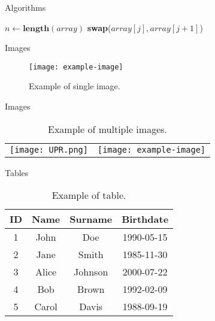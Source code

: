 \documentclass[12pt]{beamer}
\begin{document}
\begin{frame}[allowframebreaks]{Algorithms}
	\begin{algorithmic}
		\State $n \gets \textbf{length}(array)$
		\State \textbf{swap}($array[j], array[j + 1]$)
		\EndIf
		\EndFor
		\EndFor
		\EndProcedure
		\label{alg:1}
	\end{algorithmic}
\end{frame}

\begin{frame}[allowframebreaks]{Images}
	\begin{figure}
		\centering
		\texttt{[image: example-image]}
		\caption{Example of single image.}
		\label{fig:1}
	\end{figure}
\end{frame}

\begin{frame}[allowframebreaks]{Images}
	\begin{table}
		\centering
		\begin{tabular}{cc}
			\texttt{[image: UPR.png]} &
			\texttt{[image: example-image]} \\
		\end{tabular}
		\caption{Example of multiple images.}
		\label{tab:1}
	\end{table}
\end{frame}

\begin{frame}[allowframebreaks]{Tables}
	\begin{table}
		\centering
		\begin{tabular}{|c|c|c|c|}
			\hline
			\textbf{ID} & \textbf{Name} & \textbf{Surname} & \textbf{Birthdate} \\
			\hline
			1           & John          & Doe              & 1990-05-15         \\
			\hline
			2           & Jane          & Smith            & 1985-11-30         \\
			\hline
			3           & Alice         & Johnson          & 2000-07-22         \\
			\hline
			4           & Bob           & Brown            & 1992-02-09         \\
			\hline
			5           & Carol         & Davis            & 1988-09-19         \\
			\hline
		\end{tabular}
		\caption{Example of table.}
		\label{tab:2}
	\end{table}
\end{frame}
\end{document}
